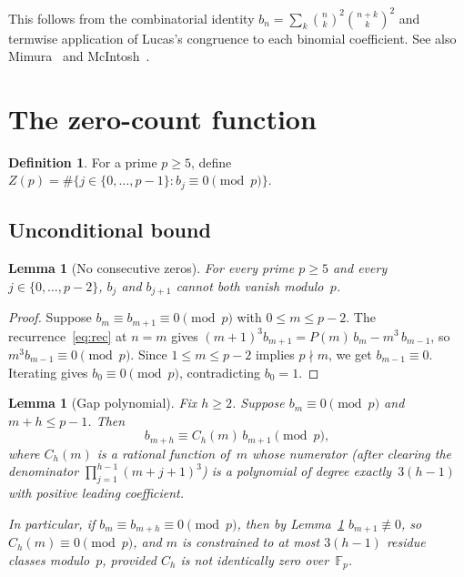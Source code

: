 \documentclass[11pt]{article}
\newtheorem{lemma}[theorem]{Lemma}
\theoremstyle{definition}
\newtheorem{definition}[theorem]{Definition}
\theoremstyle{remark}
\begin{document}
This follows from the combinatorial identity
$b_n = \sum_k \binom{n}{k}^2\binom{n+k}{k}^2$
and termwise application of Lucas's congruence
to each binomial coefficient.
See also Mimura~\cite{Mimura1983} and
McIntosh~\cite{McIntosh1992}.

\section{The zero-count function}

\begin{definition}
For a prime $p \ge 5$, define
$Z(p) = \#\{j \in \{0,\ldots,p-1\} : b_j \equiv 0 \pmod{p}\}$.
\end{definition}

\subsection{Unconditional bound}

\begin{lemma}[No consecutive zeros]\label{lem:no-consec}
For every prime $p \ge 5$ and every $j \in \{0,\ldots,p-2\}$,
$b_j$ and $b_{j+1}$ cannot both vanish modulo~$p$.
\end{lemma}

\begin{proof}
Suppose $b_m \equiv b_{m+1} \equiv 0 \pmod{p}$
with $0 \le m \le p - 2$.
The recurrence~\eqref{eq:rec} at $n = m$ gives
$(m+1)^3 b_{m+1} = P(m)\,b_m - m^3\,b_{m-1}$,
so $m^3 b_{m-1} \equiv 0 \pmod{p}$.
Since $1 \le m \le p - 2$ implies $p \nmid m$,
we get $b_{m-1} \equiv 0$.
Iterating gives $b_0 \equiv 0 \pmod{p}$,
contradicting $b_0 = 1$.
\end{proof}

\begin{lemma}[Gap polynomial]\label{lem:gap-poly}
Fix $h \ge 2$. Suppose $b_m \equiv 0 \pmod{p}$
and $m + h \le p - 1$. Then
\begin{equation}\label{eq:forward}
b_{m+h} \equiv C_h(m)\,b_{m+1} \pmod{p},
\end{equation}
where $C_h(m)$ is a rational function of~$m$ whose
numerator (after clearing the denominator
$\prod_{j=1}^{h-1}(m+j+1)^3$)
is a polynomial of degree exactly~$3(h-1)$
with positive leading coefficient.

In particular, if $b_m \equiv b_{m+h} \equiv 0 \pmod{p}$,
then by Lemma~\ref{lem:no-consec} $b_{m+1} \not\equiv 0$,
so $C_h(m) \equiv 0 \pmod{p}$, and $m$ is constrained
to at most $3(h - 1)$ residue classes modulo~$p$,
provided $C_h$ is not identically zero over~$\mathbb{F}_p$.
\end{lemma}
\end{document}
